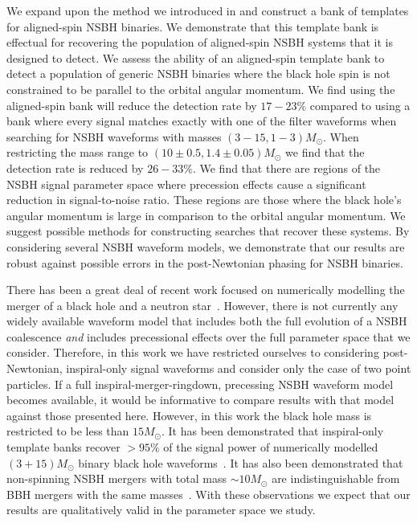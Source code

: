We expand upon the method we
introduced in \cite{Brown:2012qf} and
construct a bank of templates for aligned-spin \ac{NSBH} binaries. We
demonstrate that this template bank is effectual for recovering the population
of aligned-spin \ac{NSBH} systems that it is designed to detect. We
assess the ability of an aligned-spin template bank to detect a population of
generic
\ac{NSBH} binaries where the black hole spin is not constrained to be parallel
to the orbital angular momentum. We find using the aligned-spin
bank will reduce the detection rate by $17-23\%$ compared to using a bank where
every signal matches exactly with one of the filter waveforms when searching 
for \ac{NSBH} waveforms with masses $(3-15,1-3)M_{\odot}$. When restricting the 
mass range to $(10\pm0.5,1.4\pm0.05)M_{\odot}$ we find that the detection rate 
is reduced by $26-33\%$. We find that
there are regions of the \ac{NSBH} signal parameter space where precession
effects cause a significant reduction in signal-to-noise ratio. These regions 
are those where the black hole's angular momentum is large in comparison to 
the orbital angular momentum. We suggest possible methods for constructing 
searches that recover these systems. By considering several \ac{NSBH} waveform 
models, we demonstrate that our results are robust against possible errors in 
the post-Newtonian phasing for \ac{NSBH} binaries.

There has been a great deal of recent work focused on numerically 
modelling the merger of a black hole and a neutron 
star~\cite{Duez:2009yz,Shibata:2011jka,Pannarale:2012ux,Lackey:2013axa,
Foucart:2013psa}. However, there is not currently any widely available waveform 
model 
that includes both the full evolution of a \ac{NSBH} coalescence \emph{and} 
includes precessional effects over the full parameter space that we consider.
Therefore, in this work we have restricted ourselves to considering 
post-Newtonian, inspiral-only signal waveforms and consider only the case of two 
point particles. If a full 
inspiral-merger-ringdown, precessing \ac{NSBH} waveform model 
becomes available, it would be informative to compare results with that model 
against those presented here. However, in this work the black hole mass is 
restricted to be less than $15M_{\odot}$. It has been demonstrated that 
inspiral-only template banks recover $> 95\%$ of the signal power of 
numerically modelled $(3+15)M_{\odot}$ binary black hole 
waveforms~\cite{Brown:2012nn,Smith:2013mfa}. It has also been demonstrated that 
non-spinning \ac{NSBH} mergers with total mass $\sim 10M_{\odot}$ are 
indistinguishable from \ac{BBH} mergers with the same 
masses~\cite{Foucart:2013psa}. With these observations we expect that 
our results are qualitatively valid in the parameter space we study.

